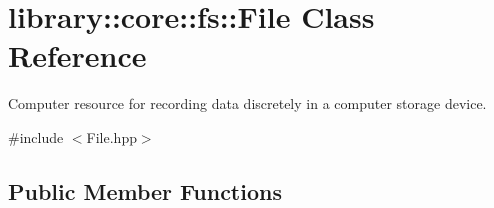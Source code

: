 \hypertarget{classlibrary_1_1core_1_1fs_1_1_file}{}\section{library\+:\+:core\+:\+:fs\+:\+:File Class Reference}
\label{classlibrary_1_1core_1_1fs_1_1_file}


Computer resource for recording data discretely in a computer storage device.  




{\ttfamily \#include $<$File.\+hpp$>$}

\subsection*{Public Member Functions}
